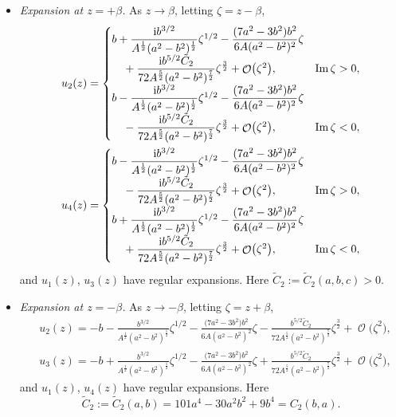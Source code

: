 \documentclass[10pt,a4paper]{amsart}
\DeclareMathOperator{\OO}{\mathcal{O}}
\numberwithin{equation}{section}
\begin{document}
 \begin{itemize}\itemsep=0pt
 \item \textit{Expansion at $z= +\beta$.}
 As $z\to \beta$, letting $\zeta = z-\beta$,
 \begin{align*}
 &u_2(z)=
 \begin{cases}
 b+ \dfrac{{\rm i}b^{3/2}}{A^{\frac{1}{2}}(a^2-b^2)^{\frac{1}{2}}}\zeta^{1/2} -\dfrac{(7a^2 - 3b^2)b^2}{6A(a^2 - b^2)^2} \zeta &\\
 \quad{} + \dfrac{{\rm i}b^{5/2}\tilde{C}_2}{72A^{\frac{5}{2}}(a^2-b^2)^{\frac{7}{2}}}\zeta^{\frac{3}{2}} + \OO\bigl(\zeta^2\bigr), & \operatorname{Im}\zeta > 0, \\[2mm]
 b -\dfrac{{\rm i}b^{3/2}}{A^{\frac{1}{2}}(a^2-b^2)^{\frac{1}{2}}}\zeta^{1/2} -\dfrac{(7a^2 - 3b^2)b^2}{6A(a^2 - b^2)^2} \zeta & \\
 \quad {} - \dfrac{{\rm i}b^{5/2}\tilde{C}_2}{72A^{\frac{5}{2}}(a^2-b^2)^{\frac{7}{2}}}\zeta^{\frac{3}{2}} + \OO\bigl(\zeta^2\bigr), & \operatorname{Im}\zeta < 0,
 \end{cases}\\
 &u_4(z)=
 \begin{cases}
 b -\dfrac{{\rm i}b^{3/2}}{A^{\frac{1}{2}}(a^2-b^2)^{\frac{1}{2}}}\zeta^{1/2} -\dfrac{(7a^2 - 3b^2)b^2}{6A(a^2 - b^2)^2} \zeta &\\
 \quad {}- \dfrac{{\rm i}b^{5/2}\tilde{C}_2}{72A^{\frac{5}{2}}(a^2-b^2)^{\frac{7}{2}}}\zeta^{\frac{3}{2}} + \OO\bigl(\zeta^2\bigr), & \operatorname{Im}\zeta > 0, \\[2mm]
 b + \dfrac{{\rm i}b^{3/2}}{A^{\frac{1}{2}}(a^2-b^2)^{\frac{1}{2}}}\zeta^{1/2} -\dfrac{(7a^2 - 3b^2)b^2}{6A(a^2 - b^2)^2} \zeta & \\
 \quad{} + \dfrac{{\rm i}b^{5/2}\tilde{C}_2}{72A^{\frac{5}{2}}(a^2-b^2)^{\frac{7}{2}}}\zeta^{\frac{3}{2}} + \OO\bigl(\zeta^2\bigr), & \operatorname{Im}\zeta < 0,
 \end{cases}
 \end{align*}
 and $u_1(z)$, $u_3(z)$ have regular expansions. Here
$\tilde{C}_2 := \tilde{C}_2(a,b,c)>0$.

 \item \textit{Expansion at $z= - \beta$.}
 As $z\to -\beta$, letting $\zeta = z+\beta$,
 \begin{align*}
 &u_2(z)= -b-\frac{b^{3/2}}{A^{\frac{1}{2}}(a^2-b^2)^{\frac{1}{2}}}\zeta^{1/2} -\frac{\bigl(7a^2 - 3b^2\bigr)b^2}{6A(a^2 - b^2)^2} \zeta - \frac{b^{5/2}\tilde{C}_2}{72A^{\frac{5}{2}}(a^2-b^2)^{\frac{7}{2}}}\zeta^{\frac{3}{2}} + \OO\bigl(\zeta^2\bigr),\\
 &u_3(z)= -b +\frac{b^{3/2}}{A^{\frac{1}{2}}(a^2-b^2)^{\frac{1}{2}}}\zeta^{1/2} -\frac{\bigl(7a^2 - 3b^2\bigr)b^2}{6A(a^2 - b^2)^2} \zeta + \frac{b^{5/2}\tilde{C}_2}{72A^{\frac{5}{2}}(a^2-b^2)^{\frac{7}{2}}}\zeta^{\frac{3}{2}} + \OO\bigl(\zeta^2\bigr),
 \end{align*}
 and $u_1(z)$, $u_4(z)$ have regular expansions. Here
 \[
 \tilde{C}_2 := \tilde{C}_2(a,b)= 101a^4 - 30a^2b^2 + 9b^4 = C_2(b,a).
 \]
 \end{itemize}
\end{document}
